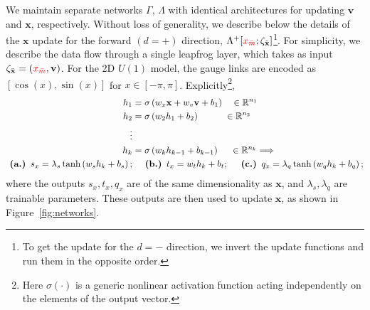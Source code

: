 \documentclass[a4paper,11pt]{article}
\newcommand{\x}{\mathbf{x}}
\newcommand{\p}{\mathbf{v}}
\newcommand{\xmaskbar}{\textcolor{red}{x_{\bar{m}}}}
\begin{document}
We maintain separate networks \(\Gamma\), \(\Lambda\) with identical
architectures for updating \(\p\) and \(\x\), respectively.
%
Without loss of generality, we describe below the details of the \(\x\) update
for the forward \((d = +)\) direction, \(\Lambda^{+}[\xmaskbar;
\zeta_{\bar{\x}}]\)\footnote{
    To get the update for the \(d=-\) direction, we invert the
    update functions and run them in the opposite order.
}.
%
For simplicity, we describe the data flow through a single leapfrog layer,
%
which takes as input \(\zeta_{\bar{\x}} = (\xmaskbar, \p)\).
%
For the 2D \(U(1)\) model, the gauge links are encoded as \([\cos(x),
\sin(x)]\) for \(x \in [-\pi, \pi]\).
%
Explicitly\footnote{
Here \(\sigma(\cdot)\) is a generic nonlinear activation function
acting independently on the elements of the output vector.
},
%
\begin{align}
    h_{1} &= \sigma\left(w_{x} \x + w_{v} \p + b_{1}\right)
        \quad \in \mathbb{R}^{n_{1}} \\
    h_{2} &= \sigma\left(w_{2} h_{1} + b_{2}\right)
        \hspace{0.085\textwidth} \in \mathbb{R}^{n_{2}} \\
    \nonumber \vdots & \\
    h_{k} &= \sigma\left(w_{k} h_{k-1} + b_{k-1}\right)
        \hspace{0.04\textwidth} \in \mathbb{R}^{n_{k}} \Longrightarrow \\
    \nonumber
    \textbf{  (a.)  } s_{x} = \lambda_{s} \tanh \left( w_{s} h_{k} + b_{s} \right);
    &\quad\textbf{  (b.)  } t_{x} = w_{t} h_{k} + b_{t};
    \quad\textbf{  (c.)  } q_{x} = \lambda_{q}\tanh\left(w_{q} h_{k} + b_{q}\right);
\end{align}
%
where the outputs \(s_{x}, t_{x}, q_{x}\) are of the same dimensionality as
\(\x\), and \(\lambda_{s}, \lambda_{q}\) are trainable parameters.
%
These outputs are then used to update \(\x\), as shown in
Figure~\ref{fig:networks}.
\end{document}
